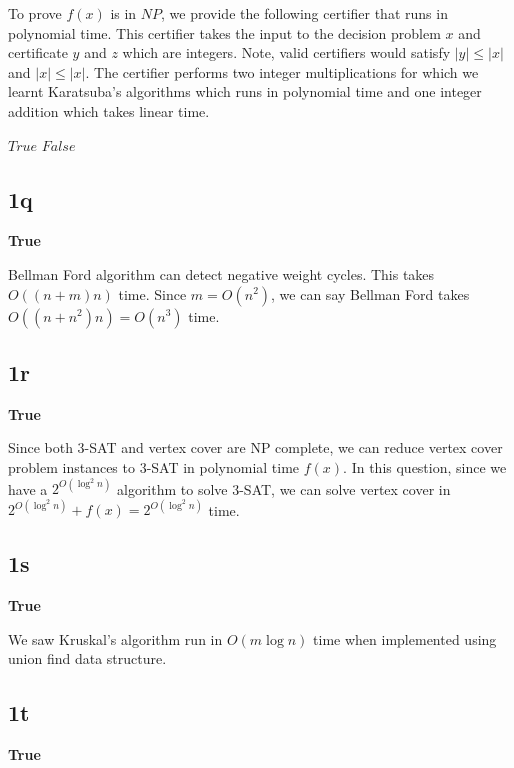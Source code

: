 \documentclass{article}
\begin{document}
    To prove $f(x)$ is in $NP$, we provide the following certifier that runs in polynomial time. This certifier takes the input to the decision problem $x$ and certificate $y$ and $z$ which are integers. Note, valid certifiers would satisfy $|y| \le |x|$ and $|x| \le |x|$. The certifier performs two integer multiplications for which we learnt Karatsuba's algorithms which runs in polynomial time and one integer addition which takes linear time.

    \begin{algorithm}[H]
        \begin{algorithmic}
                    \State \Return $True$
                \Else
                    \State \Return $False$
                \EndIf
            \EndProcedure
        \end{algorithmic}
    \end{algorithm}

    \subsection*{1q}
    \textbf{True}

    Bellman Ford algorithm can detect negative weight cycles. This takes $O((n+m)n)$ time. Since $m = O(n^2)$, we can say Bellman Ford takes $O((n+n^2)n) = O(n^3)$ time.

    \subsection*{1r}
    \textbf{True}

    Since both 3-SAT and vertex cover are NP complete, we can reduce vertex cover problem instances to 3-SAT in polynomial time $f(x)$. In this question, since we have a $2^{O(\log^2 n)}$ algorithm to solve 3-SAT, we can solve vertex cover in $2^{O(\log^2 n)} + f(x) = 2^{O(\log^2 n)}$ time.

    \subsection*{1s}
    \textbf{True}

    We saw Kruskal's algorithm run in $O(m \log n)$ time when implemented using union find data structure.

    \subsection*{1t}
    \textbf{True}
\end{document}
